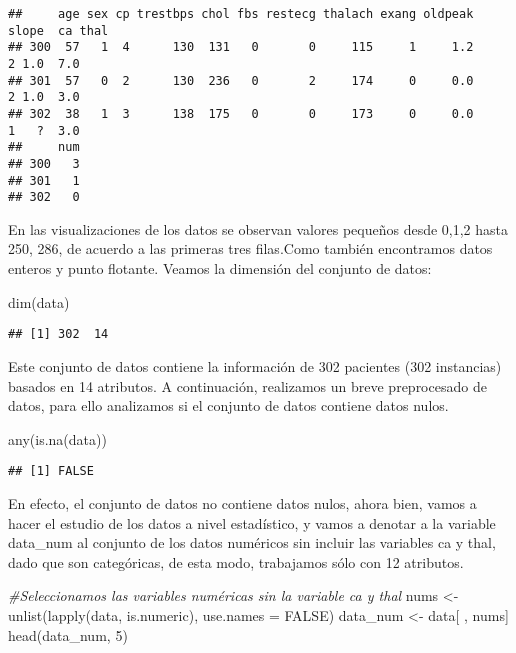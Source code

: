 \documentclass[
]{article}
\newenvironment{Shaded}{\begin{snugshade}}{\end{snugshade}}
\newcommand{\AttributeTok}[1]{\textcolor[rgb]{0.77,0.63,0.00}{#1}}
\newcommand{\CommentTok}[1]{\textcolor[rgb]{0.56,0.35,0.01}{\textit{#1}}}
\newcommand{\ConstantTok}[1]{\textcolor[rgb]{0.00,0.00,0.00}{#1}}
\newcommand{\DecValTok}[1]{\textcolor[rgb]{0.00,0.00,0.81}{#1}}
\newcommand{\FunctionTok}[1]{\textcolor[rgb]{0.00,0.00,0.00}{#1}}
\newcommand{\NormalTok}[1]{#1}
\newcommand{\OtherTok}[1]{\textcolor[rgb]{0.56,0.35,0.01}{#1}}
\begin{document}
\begin{verbatim}
##     age sex cp trestbps chol fbs restecg thalach exang oldpeak slope  ca thal
## 300  57   1  4      130  131   0       0     115     1     1.2     2 1.0  7.0
## 301  57   0  2      130  236   0       2     174     0     0.0     2 1.0  3.0
## 302  38   1  3      138  175   0       0     173     0     0.0     1   ?  3.0
##     num
## 300   3
## 301   1
## 302   0
\end{verbatim}

En las visualizaciones de los datos se observan valores pequeños desde
0,1,2 hasta 250, 286, de acuerdo a las primeras tres filas.Como también
encontramos datos enteros y punto flotante. Veamos la dimensión del
conjunto de datos:

\begin{Shaded}
\begin{Highlighting}[]
\FunctionTok{dim}\NormalTok{(data)}
\end{Highlighting}
\end{Shaded}

\begin{verbatim}
## [1] 302  14
\end{verbatim}

Este conjunto de datos contiene la información de 302 pacientes (302
instancias) basados en 14 atributos. A continuación, realizamos un breve
preprocesado de datos, para ello analizamos si el conjunto de datos
contiene datos nulos.

\begin{Shaded}
\begin{Highlighting}[]
\FunctionTok{any}\NormalTok{(}\FunctionTok{is.na}\NormalTok{(data))}
\end{Highlighting}
\end{Shaded}

\begin{verbatim}
## [1] FALSE
\end{verbatim}

En efecto, el conjunto de datos no contiene datos nulos, ahora bien,
vamos a hacer el estudio de los datos a nivel estadístico, y vamos a
denotar a la variable data\_num al conjunto de los datos numéricos sin
incluir las variables ca y thal, dado que son categóricas, de esta modo,
trabajamos sólo con 12 atributos.

\begin{Shaded}
\begin{Highlighting}[]
\CommentTok{\#Seleccionamos las variables numéricas sin la variable ca y thal}
\NormalTok{nums }\OtherTok{\textless{}{-}} \FunctionTok{unlist}\NormalTok{(}\FunctionTok{lapply}\NormalTok{(data, is.numeric), }\AttributeTok{use.names =} \ConstantTok{FALSE}\NormalTok{) }
\NormalTok{data\_num }\OtherTok{\textless{}{-}}\NormalTok{ data[ , nums]}
\FunctionTok{head}\NormalTok{(data\_num, }\DecValTok{5}\NormalTok{)}
\end{Highlighting}
\end{Shaded}
\end{document}

